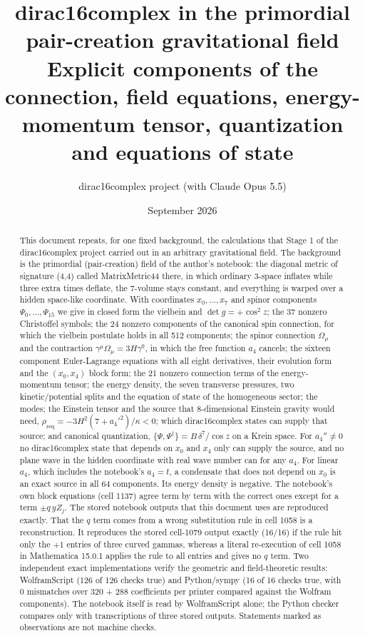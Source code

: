 \documentclass[11pt]{article}
\title{dirac16complex in the primordial pair-creation gravitational field\\[0.5em]\large Explicit components of the connection, field equations, energy-momentum tensor, quantization and equations of state}
\author{dirac16complex project (with Claude Opus 5.5)}
\date{September 2026}
\begin{document}
\maketitle
\tableofcontents
\newpage
\begin{abstract}
This document repeats, for one fixed background, the calculations that Stage 1 of the dirac16complex project carried out in an arbitrary gravitational field. The background is the primordial (pair-creation) field of the author's notebook: the diagonal metric of signature (4,4) called MatrixMetric44 there, in which ordinary 3-space inflates while three extra times deflate, the 7-volume stays constant, and everything is warped over a hidden space-like coordinate. With coordinates $x_0,\dots,x_7$ and spinor components $\Psi_0,\dots,\Psi_{15}$ we give in closed form the vielbein and $\det g=+\cos^2z$; the 37 nonzero Christoffel symbols; the 24 nonzero components of the canonical spin connection, for which the vielbein postulate holds in all 512 components; the spinor connection $\Omega_\mu$ and the contraction $\gamma^\mu\Omega_\mu=3H\gamma^0$, in which the free function $a_4$ cancels; the sixteen component Euler-Lagrange equations with all eight derivatives, their evolution form and the $(x_0,x_4)$ block form; the 21 nonzero connection terms of the energy-momentum tensor; the energy density, the seven transverse pressures, two kinetic/potential splits and the equation of state of the homogeneous sector; the modes; the Einstein tensor and the source that 8-dimensional Einstein gravity would need, $\rho_{\mathrm{req}}=-3H^2(7+a_4'^2)/\kappa<0$; which dirac16complex states can supply that source; and canonical quantization, $\{\Psi,\Psi^\dagger\}=B\,\delta^7/\cos z$ on a Krein space. For $a_4''\ne0$ no dirac16complex state that depends on $x_0$ and $x_4$ only can supply the source, and no plane wave in the hidden coordinate with real wave number can for any $a_4$. For linear $a_4$, which includes the notebook's $a_4=t$, a condensate that does not depend on $x_0$ is an exact source in all 64 components. Its energy density is negative. The notebook's own block equations (cell 1137) agree term by term with the correct ones except for a term $\pm q\,yZ_j$. The stored notebook outputs that this document uses are reproduced exactly. That the $q$ term comes from a wrong substitution rule in cell 1058 is a reconstruction. It reproduces the stored cell-1079 output exactly (16/16) if the rule hit only the $+1$ entries of three curved gammas, whereas a literal re-execution of cell 1058 in Mathematica 15.0.1 applies the rule to all entries and gives no $q$ term. Two independent exact implementations verify the geometric and field-theoretic results: WolframScript (126 of 126 checks true) and Python/sympy (16 of 16 checks true, with 0 mismatches over 320 + 288 coefficients per printer compared against the Wolfram components). The notebook itself is read by WolframScript alone; the Python checker compares only with transcriptions of three stored outputs. Statements marked as observations are not machine checks.

\end{abstract}
\end{document}
